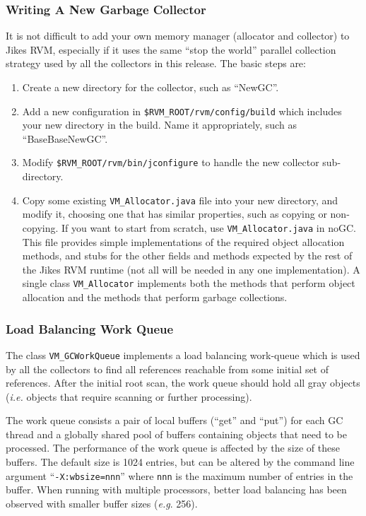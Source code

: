 \subsubsection{Writing A New Garbage Collector}
It is not difficult to add your own memory manager (allocator and collector) to Jikes RVM,
especially if it uses the same ``stop the world'' parallel collection
strategy used by all the collectors in this release.  The basic steps
are:
\begin{enumerate}
\item Create a new directory for the collector, such as ``NewGC''.
\item Add a new configuration in {\tt \$RVM\_ROOT/rvm/config/build}
which includes your new directory in the build.  Name it appropriately, such as
``BaseBaseNewGC''.
\item Modify {\tt \$RVM\_ROOT/rvm/bin/jconfigure} to handle the new collector sub-directory.
\item Copy some existing {\tt VM\_Allocator.java} file into your new directory,
and modify it, choosing one that has similar properties, such as copying or
non-copying.  If you want to start from scratch, use {\tt VM\_Allocator.java} in noGC.
This file provides simple implementations of the required object allocation
methods, and stubs for the other fields and methods expected by the rest
of the Jikes RVM runtime (not all will be needed in any one implementation).
A single class {\tt VM\_Allocator} implements both
the methods that perform object allocation and the methods that perform
garbage collections.
\end{enumerate}

\subsubsection{Load Balancing Work Queue}
The class {\tt VM\_GCWorkQueue} implements a load balancing work-queue
which is used by all the collectors to find all references reachable from
some initial set of references.  After the initial root scan, the work queue
should hold all gray objects ({\it i.e.} objects that require scanning or further
processing).

The work queue consists a pair of local buffers (``get'' and ``put'') for each GC thread
and a globally shared pool of buffers containing objects that need to be processed.  
The performance of the work queue is affected by the size of these buffers.  
The default size is 1024 entries, but can be altered by the command line argument ``{\tt -X:wbsize=nnn}'' 
where {\tt nnn} is the maximum number of entries in the buffer.  When running with multiple
processors, better load balancing has been observed with smaller buffer sizes ({\it e.g}. 256).

